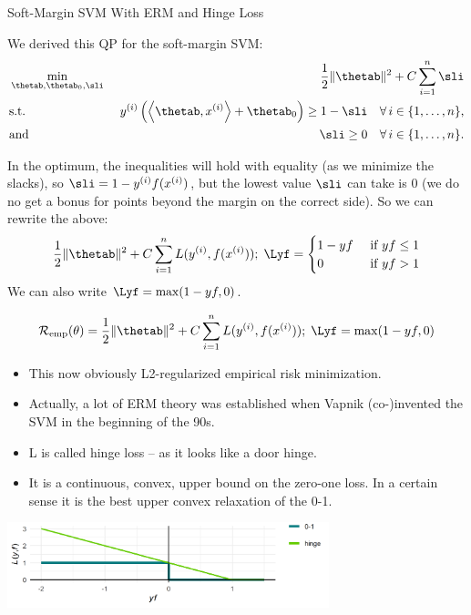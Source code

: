 \begin{vbframe}{Soft-Margin SVM With ERM and Hinge Loss}

We derived this QP for the soft-margin SVM: 
  \begin{eqnarray*}
    & \min\limits_{\thetab, \thetab_0,\sli} & \frac{1}{2} \|\thetab\|^2 + C   \sum_{i=1}^n \sli \\
    & \text{s.t.} & \,\, \yi  \left( \scp{\thetab}{\xi} + \thetab_0 \right) \geq 1 - \sli \quad \forall\, i \in \nset,\\
    & \text{and} & \,\, \sli \geq 0 \quad \forall\, i \in \nset.
  \end{eqnarray*}

  In the optimum, the inequalities will hold with equality (as we minimize the slacks), so $\sli = 1 - \yi \fxi$, but the lowest value $\sli$ can take is 0 (we do no get a bonus for points beyond the margin on the correct side).
  So we can rewrite the above: 
\begin{align*} 
    \frac{1}{2} \|\thetab\|^2 + C \sumin \Lxyi ;\; \Lyf = 
    \begin{cases} 
      1 - y f & \text{ if } y f \leq 1 \\ 
      0       & \text{ if } y f > 1 
    \end{cases}
\end{align*} 
We can also write $\Lyf = \max(1-yf, 0)$.

\framebreak
  $$ \risket = \frac{1}{2} \|\thetab\|^2 + C \sumin \Lxyi ;\; \Lyf = \max(1-yf, 0)$$
  \begin{itemize}
    \item This now obviously L2-regularized empirical risk minimization.
    \item Actually, a lot of ERM theory was established when Vapnik (co-)invented the SVM in the beginning of the 90s.
    \item L is called hinge loss -- as it looks like a door hinge.
    \item It is a continuous, convex, upper bound on the zero-one loss.
      In a certain sense it is the best upper convex relaxation of the 0-1.
  \end{itemize}


\begin{center}
\includegraphics[width = 0.7\textwidth]{figure/soft_margin_losses.png} \\
\end{center}


\end{vbframe}
